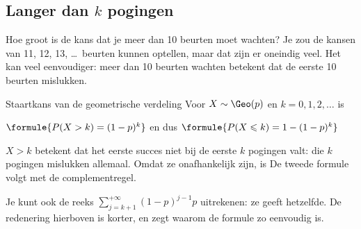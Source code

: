 \subsection{Langer dan $k$ pogingen}

Hoe groot is de kans dat je meer dan 10 beurten moet wachten? Je zou de kansen van 11, 12, 13, \ldots\ beurten kunnen optellen, maar dat zijn er oneindig veel. Het kan veel eenvoudiger: meer dan 10 beurten wachten betekent dat de eerste 10 beurten mislukken.

\begin{theorie}
\begin{stelling}{Staartkans van de geometrische verdeling}
Voor $X \sim \Geo(p)$ en $k = 0, 1, 2, \ldots$ is

\vspace{1mm}
\qquad $\formule{P(X > k) = (1 - p)^k}$ \quad en dus \quad $\formule{P(X \leqslant k) = 1 - (1 - p)^k}$
\end{stelling}

\begin{bewijs}
$X > k$ betekent dat het eerste succes niet bij de eerste $k$ pogingen valt: die $k$ pogingen mislukken allemaal. Omdat ze onafhankelijk zijn, is
De tweede formule volgt met de complementregel.
\end{bewijs}
\end{theorie}

Je kunt ook de reeks $\sum_{j=k+1}^{+\infty} (1 - p)^{j-1}p$ uitrekenen: ze geeft hetzelfde. De redenering hierboven is korter, en zegt waarom de formule zo eenvoudig is.


